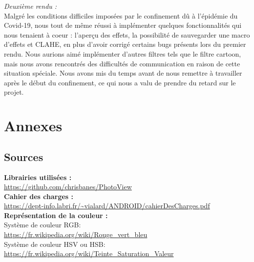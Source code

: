 \documentclass[12pt, a4paper]{article}
\begin{document}
\emph{Deuxième rendu :}
\\
Malgré les conditions difficiles imposées par le confinement dû à l'épidémie du Covid-19, nous tout de même réussi à implémenter quelques fonctionnalités qui nous tenaient à coeur : l'aperçu des effets, la possibilité de sauvegarder une macro d'effets et CLAHE, en plus d'avoir corrigé certains bugs présents lors du premier rendu.
Nous aurions aimé implémenter d'autres filtres tels que le filtre cartoon, mais nous avons rencontrés des difficultés de communication en raison de cette situation spéciale. Nous avons mis du temps avant de nous remettre à travailler après le début du confinement,
ce qui nous a valu de prendre du retard sur le projet. 

\section{Annexes}

\subsection{Sources}

  \textbf{Librairies utilisées :}
  \\
  \url{https://github.com/chrisbanes/PhotoView}
  \\

  \textbf{Cahier des charges :}
  \\
  \url{https://dept-info.labri.fr/~vialard/ANDROID/cahierDesCharges.pdf}
  \\

  \textbf{Représentation de la couleur :}
  \\
  Système de couleur RGB:
  \\
  \url{https://fr.wikipedia.org/wiki/Rouge_vert_bleu}
  \\
  Système de couleur HSV ou HSB:
  \\
  \url{https://fr.wikipedia.org/wiki/Teinte_Saturation_Valeur}
  \\
\end{document}

